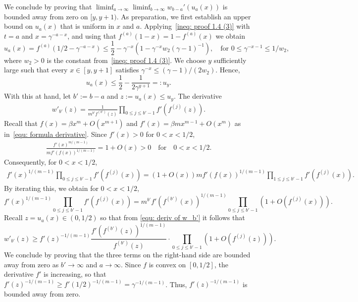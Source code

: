 \documentclass[11pt]{article}
\numberwithin{theorem}{section}
\begin{document}
We conclude by proving that $\liminf_{a\to\infty}\liminf_{b\to \infty}w_{b-a}'(u_a(x))$ is bounded away from zero on $[y,y+1)$. As preparation, we first establish an upper bound on $u_a(x)$ that is uniform in $x$ and $a$.
Applying~\eqref{ineq: proof 1.4 (3)} with $t=a$ and $x=\gamma^{-a-x}$, and using that $f^{(a)}(1-x) = 1-f^{(a)}(x)$ we obtain
\[
u_a(x) = f^{(a)}(1/2-\gamma^{-a-x}) \leq 
\frac{1}{2}- \gamma^{-x}   \left(1- \gamma^{-x}w_2  (\gamma-1)^{-1}\right),
\quad \text{for } 0\leq \gamma^{-x-1} \leq 1/w_2,
\]
where $w_2>0$ is the constant from~\eqref{ineq: proof 1.4 (3)}. 
We choose $y$ sufficiently large such that every $x\in[y,y+1]$ satisfies $\gamma^{-x}\leq (\gamma-1)/(2w_2)$. Hence,
\[
    u_a(x) \leq \frac{1}{2}- \frac{1}{2\gamma^{y+1}} =:u_y.
\]
With this at hand, let $b':=b-a$ and $z:=u_a(x)\leq u_y$.
The derivative  
\begin{align}\label{equ: deriv of w_b'}
    w'_{b'}(z) = \frac{1}{m^{b'} f^{(b')}(z)}\prod_{0\leq j \leq b'-1}f'(f^{(j)}(z)).
\end{align}
Recall that $f(x)=\beta x^m+O(x^{m+1})$ and $f'(x)=\beta m x^{m-1}+O(x^m)$ as in~\eqref{equ: formula derivative}. Since $f'(x)>0$ for $0<x<1/2$,
\begin{align}\label{equ: quotient}
    \frac{f'(x)^{m/(m-1)}}{m f'(f(x))^{1/(m-1)}} = 1+O(x)>0
    \quad\text{for}\quad 0<x<1/2.
\end{align}
Consequently, for $0<x<1/2$,
\begin{align*}
    f'(x)^{1/(m-1)}\prod_{0\leq j \leq b'-1}f'(f^{(j)}(x))
    =
    (1+O(x))m f'(f(x))^{1/(m-1)}  \prod_{1\leq j \leq b'-1}f'(f^{(j)}(x)).
\end{align*}
By iterating this, we obtain for $0<x<1/2$,
\[
    f'(x)^{1/(m-1)}\prod_{0\leq j \leq b'-1}f'(f^{(j)}(x))
    = m^{b'}f'(f^{(b')}(x))^{1/(m-1)} \prod_{0\leq j\leq b'-1}(1+O(f^{(j)}(x))).
\]
Recall $z=u_a(x) \in (0,1/2)$ so that from \eqref{equ: deriv of w_b'} it follows that
\begin{equation}
\label{eq:w'b'2}
    w'_{b'}(z)
    \geq
    f'(z)^{-1/(m-1)}\frac{f'(f^{(b')}(z))^{1/(m-1)}}{f^{(b')}(z)} \cdot  \prod_{0\leq j\leq b'-1}(1+O(f^{(j)}(z))).
\end{equation}
We conclude by proving that the three terms on the right-hand side are bounded away from zero as $b'\to\infty$ and $a\to\infty$.
Since $f$ is convex on $[0,1/2]$, the derivative $f'$ is increasing, so that $f'(z)^{-1/(m-1)} \geq f'(1/2)^{-1/(m-1)} = \gamma^{-1/(m-1)}$. Thus, $f'(z)^{-1/(m-1)}$ is bounded away from zero. 
\end{document}
